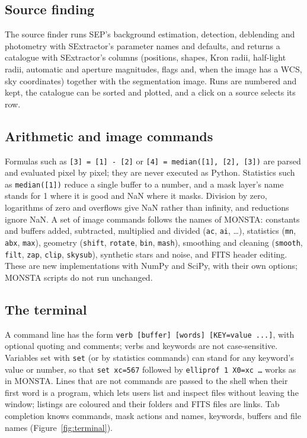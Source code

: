 \documentclass[twocolumn]{aastex701}
\newcommand{\code}[1]{\texttt{#1}}
\begin{document}
\subsection{Source finding}

The source finder runs SEP's background estimation, detection, deblending and photometry
with SExtractor's parameter names and defaults, and returns a catalogue with SExtractor's
columns (positions, shapes, Kron radii, half-light radii, automatic and aperture
magnitudes, flags and, when the image has a WCS, sky coordinates) together with the
segmentation image. Runs are numbered and kept, the catalogue can be sorted and plotted,
and a click on a source selects its row.

\subsection{Arithmetic and image commands}

Formulas such as \code{[3] = [1] - [2]} or \code{[4] = median([1], [2], [3])} are parsed
and evaluated pixel by pixel; they are never executed as Python. Statistics such as
\code{median([1])} reduce a single buffer to a number, and a mask layer's name stands for
1 where it is good and NaN where it masks. Division by zero, logarithms of zero and
overflows give NaN rather than infinity, and reductions ignore NaN. A set of image
commands follows the names of MONSTA: constants and buffers added, subtracted, multiplied
and divided (\code{ac}, \code{ai}, \ldots), statistics (\code{mn}, \code{abx}, \code{max}),
geometry (\code{shift}, \code{rotate}, \code{bin}, \code{mash}), smoothing and cleaning
(\code{smooth}, \code{filt}, \code{zap}, \code{clip}, \code{skysub}), synthetic stars and
noise, and FITS header editing. These are new implementations with NumPy and SciPy, with
their own options; MONSTA scripts do not run unchanged.

\subsection{The terminal}

A command line has the form \code{verb [buffer] [words] [KEY=value ...]}, with optional
quoting and comments; verbs and keywords are not case-sensitive. Variables set with
\code{set} (or by statistics commands) can stand for any keyword's value or number, so that
\code{set xc=567} followed by \code{elliprof 1 X0=xc \ldots} works as in MONSTA. Lines
that are not commands are passed to the shell when their first word is a program, which
lets users list and inspect files without leaving the window; listings are coloured and
their folders and FITS files are links. Tab completion knows commands, mask actions and
names, keywords, buffers and file names (Figure~\ref{fig:terminal}).
\end{document}

